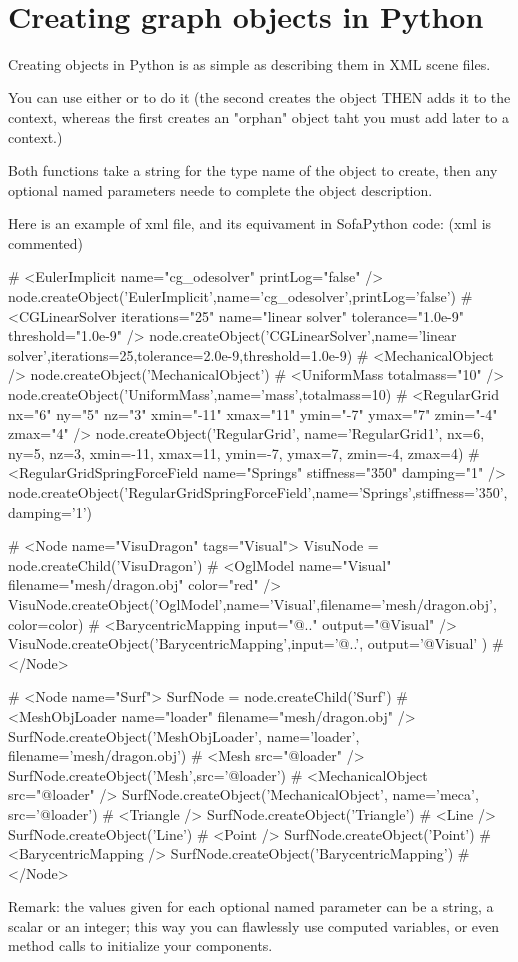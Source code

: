 \
\section{Creating graph objects in Python}


Creating objects in Python is as simple as describing them in XML scene files.

You can use either  or  to do it (the second creates the object THEN adds it to the context, whereas the first creates an "orphan" object taht you must add later to a context.)

Both functions take a string for the type name of the object to create, then any optional named parameters neede to complete the object description.

Here is an example of xml file, and its equivament in SofaPython code: (xml is commented)

\begin{code_python}
#        <EulerImplicit name="cg_odesolver" printLog="false" />
	node.createObject('EulerImplicit',name='cg_odesolver',printLog='false')
#        <CGLinearSolver iterations="25" name="linear solver" tolerance="1.0e-9" threshold="1.0e-9" />
	node.createObject('CGLinearSolver',name='linear solver',iterations=25,tolerance=2.0e-9,threshold=1.0e-9)
#        <MechanicalObject />
	node.createObject('MechanicalObject')
#        <UniformMass totalmass="10" />
	node.createObject('UniformMass',name='mass',totalmass=10)
#        <RegularGrid nx="6" ny="5" nz="3" xmin="-11" xmax="11" ymin="-7" ymax="7" zmin="-4" zmax="4" />
	node.createObject('RegularGrid', name='RegularGrid1', nx=6, ny=5, nz=3, xmin=-11, xmax=11, ymin=-7, ymax=7, zmin=-4, zmax=4)
#        <RegularGridSpringForceField name="Springs" stiffness="350" damping="1" />
	node.createObject('RegularGridSpringForceField',name='Springs',stiffness='350', damping='1')

#        <Node name="VisuDragon" tags="Visual">
	VisuNode = node.createChild('VisuDragon')
#            <OglModel name="Visual" filename="mesh/dragon.obj" color="red" />
	VisuNode.createObject('OglModel',name='Visual',filename='mesh/dragon.obj', color=color)
#            <BarycentricMapping input="@.." output="@Visual" />
	VisuNode.createObject('BarycentricMapping',input='@..', output='@Visual' )
#        </Node>	

#        <Node name="Surf">
	SurfNode = node.createChild('Surf')
#            <MeshObjLoader name="loader" filename="mesh/dragon.obj" />
	SurfNode.createObject('MeshObjLoader', name='loader', filename='mesh/dragon.obj')
#            <Mesh src="@loader" />
	SurfNode.createObject('Mesh',src='@loader')
#            <MechanicalObject src="@loader" />
	SurfNode.createObject('MechanicalObject', name='meca', src='@loader')
#            <Triangle />
	SurfNode.createObject('Triangle')
#            <Line />
	SurfNode.createObject('Line')
#            <Point />
	SurfNode.createObject('Point')
#            <BarycentricMapping />
	SurfNode.createObject('BarycentricMapping')
#        </Node>	


\end{code_python}


Remark: the values given for each optional named parameter can be a string, a scalar or an integer; this way you can flawlessly use computed variables, or even method calls to initialize your components.
